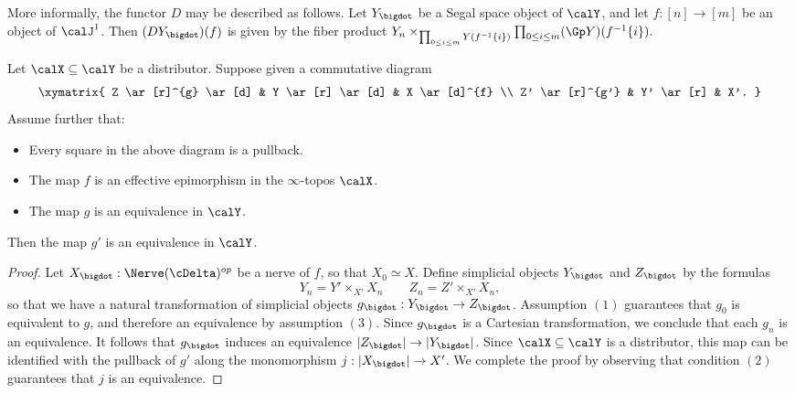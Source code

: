 \begin{remark}
More informally, the functor $D$ may be described as follows. Let $Y_{\bigdot}$ be
a Segal space object of $\calY$, and let $f: [n] \rightarrow [m]$ be an object of
$\calJ^1$. Then $(DY_{\bigdot})(f)$ is given by the fiber product
$Y_{n} \times_{ \prod_{0 \leq i \leq m} Y( f^{-1} \{i\} ) } \prod_{0 \leq i \leq m} (\Gp Y)(f^{-1} \{i\} ).$
\end{remark}

\begin{lemma}\label{precooke}
Let $\calX \subseteq \calY$ be a distributor. Suppose given a commutative diagram
$$ \xymatrix{ Z \ar[r]^{g} \ar[d] & Y \ar[r] \ar[d] & X \ar[d]^{f} \\
Z' \ar[r]^{g'} & Y' \ar[r] & X'. }$$
Assume further that:
\begin{itemize}
\item[$(1)$] Every square in the above diagram is a pullback.
\item[$(2)$] The map $f$ is an effective epimorphism in the $\infty$-topos $\calX$.
\item[$(3)$] The map $g$ is an equivalence in $\calY$.
\end{itemize}
Then the map $g'$ is an equivalence in $\calY$.
\end{lemma}

\begin{proof}
Let $X_{\bigdot}: \Nerve(\cDelta)^{op}$ be a \Cech nerve of $f$, so that
$X_0 \simeq X$.
Define simplicial objects $Y_{\bigdot}$ and $Z_{\bigdot}$ by the formulas
$$ Y_{n} = Y' \times_{X'} X_n \quad \quad Z_n = Z' \times_{X'} X_n,$$
so that we have a natural transformation of simplicial objects
$g_{\bigdot}: Y_{\bigdot} \rightarrow Z_{\bigdot}$. Assumption $(1)$ guarantees that
$g_0$ is equivalent to $g$, and therefore an equivalence by assumption $(3)$. Since
$g_{\bigdot}$ is a Cartesian transformation, we conclude that each $g_{n}$ is an equivalence. It follows
that $g_{\bigdot}$ induces an equivalence $|Z_{\bigdot} | \rightarrow |Y_{\bigdot} |$. 
Since $\calX \subseteq \calY$ is a distributor, this map can be identified with the pullback of
$g'$ along the monomorphism $j: | X_{\bigdot} | \rightarrow X'$. We complete the proof by observing that condition $(2)$ guarantees that $j$ is an equivalence.
\end{proof}

